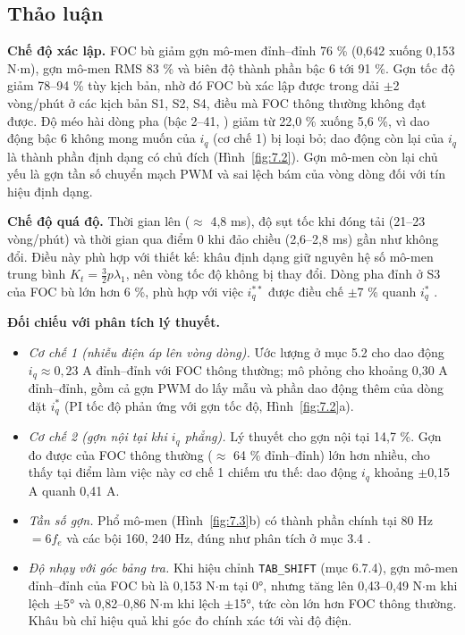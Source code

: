 \subsection{Thảo luận}\label{sec:7.4}

\textbf{Chế độ xác lập.} FOC bù giảm gợn mô-men đỉnh–đỉnh 76 \% (0,642 xuống 0,153 N$\cdot$m), gợn mô-men RMS 83 \% và biên độ thành phần bậc 6 tới 91 \%. Gợn tốc độ giảm 78–94 \% tùy kịch bản, nhờ đó FOC bù xác lập được trong dải $\pm$2 vòng/phút ở các kịch bản S1, S2, S4, điều mà FOC thông thường không đạt được. Độ méo hài dòng pha (bậc 2–41, \cite{r3}) giảm từ 22,0 \% xuống 5,6 \%, vì dao động bậc 6 không mong muốn của $i_q$ (cơ chế 1) bị loại bỏ; dao động còn lại của $i_q$ là thành phần định dạng có chủ đích (Hình~\ref{fig:7.2}). Gợn mô-men còn lại chủ yếu là gợn tần số chuyển mạch PWM và sai lệch bám của vòng dòng đối với tín hiệu định dạng.

\textbf{Chế độ quá độ.} Thời gian lên ($\approx$ 4,8 ms), độ sụt tốc khi đóng tải (21–23 vòng/phút) và thời gian qua điểm 0 khi đảo chiều (2,6–2,8 ms) gần như không đổi. Điều này phù hợp với thiết kế: khâu định dạng giữ nguyên hệ số mô-men trung bình $K_t = \tfrac32 p\lambda_1$, nên vòng tốc độ không bị thay đổi. Dòng pha đỉnh ở S3 của FOC bù lớn hơn 6 \%, phù hợp với việc $i_q^{**}$ được điều chế $\pm$7 \% quanh $i_q^*$ \cite{r2}.

\textbf{Đối chiếu với phân tích lý thuyết.}

\begin{itemize}[leftmargin=*]
\item \emph{Cơ chế 1 (nhiễu điện áp lên vòng dòng).} Ước lượng ở mục 5.2 cho dao động $i_q \approx 0{,}23$ A đỉnh–đỉnh với FOC thông thường; mô phỏng cho khoảng 0,30 A đỉnh–đỉnh, gồm cả gợn PWM do lấy mẫu và phần dao động thêm của dòng đặt $i_q^*$ (PI tốc độ phản ứng với gợn tốc độ, Hình~\ref{fig:7.2}a).
\item \emph{Cơ chế 2 (gợn nội tại khi $i_q$ phẳng).} Lý thuyết cho gợn nội tại 14,7 \%. Gợn đo được của FOC thông thường ($\approx$ 64 \% đỉnh–đỉnh) lớn hơn nhiều, cho thấy tại điểm làm việc này cơ chế 1 chiếm ưu thế: dao động $i_q$ khoảng $\pm$0,15 A quanh 0,41 A.
\item \emph{Tần số gợn.} Phổ mô-men (Hình~\ref{fig:7.3}b) có thành phần chính tại 80 Hz $= 6 f_e$ và các bội 160, 240 Hz, đúng như phân tích ở mục 3.4 \cite{r1}.
\item \emph{Độ nhạy với góc bảng tra.} Khi hiệu chỉnh \texttt{TAB\_SHIFT} (mục 6.7.4), gợn mô-men đỉnh–đỉnh của FOC bù là 0,153 N$\cdot$m tại 0°, nhưng tăng lên 0,43–0,49 N$\cdot$m khi lệch $\pm$5° và 0,82–0,86 N$\cdot$m khi lệch $\pm$15°, tức còn lớn hơn FOC thông thường. Khâu bù chỉ hiệu quả khi góc đo chính xác tới vài độ điện.
\end{itemize}

